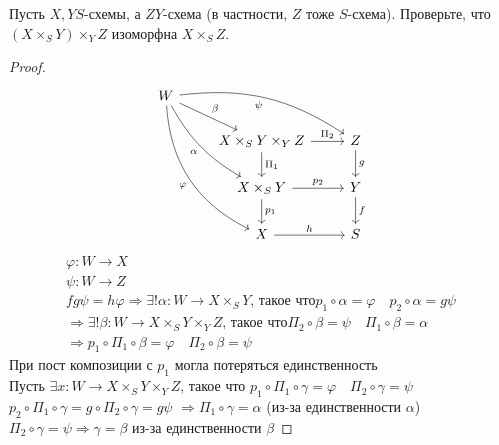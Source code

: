 \begin{prob}
Пусть $X, Y S$-схемы, а $Z Y$-схема (в частности, $Z$ тоже $S$-схема). Проверьте, что $\left(X \times_S Y\right) \times_Y Z$ изоморфна $X \times_S Z$.
\end{prob}
\begin{proof}
\begin{equation*}
\begin{tikzcd}
W \arrow{rd}{\beta} \arrow[bend left=20,swap]{rrd}{\psi} \arrow[bend right=15,swap]{rdd}{\alpha} \arrow[bend right=30,swap]{rddd}{\varphi} & & \\
& X \times_S Y \times_Y Z \arrow{r}{\Pi_2} \arrow{d}{\Pi_1} & Z \arrow{d}{g} \\
& X \times_S Y \arrow{r}{p_2} \arrow{d}{p_1}                & Y \arrow{d}{f} \\
& X \arrow{r}{h}                                            & S
\end{tikzcd}
\end{equation*}
\begin{gather*}
\varphi: W \to X\\
\psi: W \to Z\\
fg \psi = h \varphi
\Rightarrow \exists ! \alpha: W \to X \times_S Y \text{, такое что}
p_1 \circ \alpha = \varphi\quad p_2 \circ \alpha = g \psi\\
\Rightarrow \exists ! \beta: W \to X \times_S Y \times_Y Z \text{, такое что}
\Pi_2 \circ \beta = \psi\quad \Pi_1 \circ \beta = \alpha\\
\Rightarrow p_1 \circ \Pi_1 \circ \beta = \varphi\quad \Pi_2 \circ \beta = \psi
\end{gather*}
При пост композиции с $p_1$ могла потеряться единственность\\
Пусть $\exists x: W \to X \times_S Y \times_Y Z$, такое что $p_1 \circ \Pi_1 \circ \gamma = \varphi\quad \Pi_2 \circ \gamma = \psi$ $p_2 \circ \Pi_1 \circ \gamma = g \circ \Pi_2 \circ \gamma = g \psi$ $\Rightarrow \Pi_1 \circ \gamma = \alpha$ (из-за единственности $\alpha$) $\Pi_2 \circ \gamma = \psi \Rightarrow \gamma = \beta$ из-за единственности $\beta$
\end{proof}
